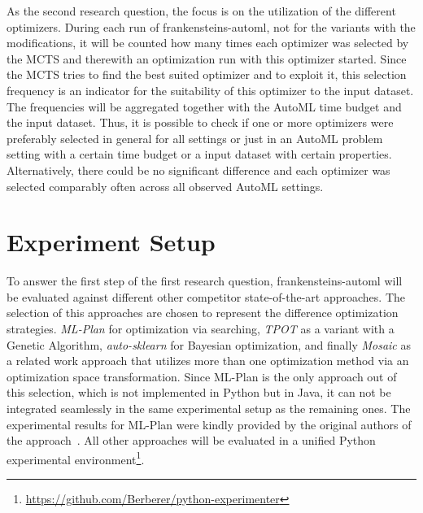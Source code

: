 As the second research question, the focus is on the utilization of the different optimizers.
During each run of frankensteins-automl, not for the variants with the modifications, it will be counted how many times each optimizer was selected by the MCTS and therewith an optimization run with this optimizer started.
Since the MCTS tries to find the best suited optimizer and to exploit it, this selection frequency is an indicator for the suitability of this optimizer to the input dataset.\newline
The frequencies will be aggregated together with the AutoML time budget and the input dataset.
Thus, it is possible to check if one or more optimizers were preferably selected in general for all settings or just in an AutoML problem setting with a certain time budget or a input dataset with certain properties.
Alternatively, there could be no significant difference and each optimizer was selected comparably often across all observed AutoML settings.

\section{Experiment Setup}
\label{sec:evaluation:setup}
To answer the first step of the first research question, frankensteins-automl will be evaluated against different other competitor state-of-the-art approaches.
The selection of this approaches are chosen to represent the difference optimization strategies.
\textit{ML-Plan} for optimization via searching, \textit{TPOT} as a variant with a Genetic Algorithm, \textit{auto-sklearn} for Bayesian optimization, and finally \textit{Mosaic} as a related work approach that utilizes more than one optimization method via an optimization space transformation.\newline
Since ML-Plan is the only approach out of this selection, which is not implemented in Python but in Java, it can not be integrated seamlessly in the same experimental setup as the remaining ones.
The experimental results for ML-Plan were kindly provided by the original authors of the approach~\textcite{Mohr-ML-Plan}.
All other approaches will be evaluated in a unified Python experimental environment\footnote{\url{https://github.com/Berberer/python-experimenter}}.

